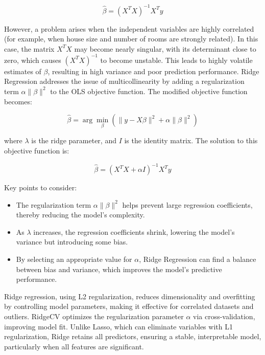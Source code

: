 \documentclass[12pt]{article}  %
\begin{document}
\begin{equation}
    \hat{\beta} = (X^T X)^{-1} X^T y \tag{2}
\end{equation}


However, a problem arises when the independent variables are highly correlated (for example, when house size and number of rooms are strongly related). In this case, the matrix \( X^T X \) may become nearly singular, with its determinant close to zero, which causes \( (X^T X)^{-1} \) to become unstable. This leads to highly volatile estimates of \( \beta \), resulting in high variance and poor prediction performance.
Ridge Regression addresses the issue of multicollinearity by adding a regularization term \( \alpha \| \beta \|^2 \) to the OLS objective function. The modified objective function becomes:

\begin{equation}
    \hat{\beta} = \arg \min_{\beta} \left( \| y - X \beta \|^2 + \alpha \| \beta \|^2 \right) \tag{3}
\end{equation}



where \( \lambda \) is the ridge parameter, and \( I \) is the identity matrix. The solution to this objective function is:

\begin{equation}
    \hat{\beta} = (X^T X + \alpha I)^{-1} X^T y \tag{4}
\end{equation}


Key points to consider:

\begin{itemize}
    \item The regularization term \( \alpha \| \beta \|^2 \) helps prevent large regression coefficients, thereby reducing the model's complexity.
    \item As \( \lambda \) increases, the regression coefficients shrink, lowering the model's variance but introducing some bias.
    \item By selecting an appropriate value for \( \alpha \), Ridge Regression can find a balance between bias and variance, which improves the model's predictive performance.
\end{itemize}

Ridge regression, using L2 regularization, reduces dimensionality and overfitting by controlling model parameters, making it effective for correlated datasets and outliers. RidgeCV optimizes the regularization parameter \( \alpha \) via cross-validation, improving model fit. Unlike Lasso, which can eliminate variables with L1 regularization, Ridge retains all predictors, ensuring a stable, interpretable model, particularly when all features are significant.
\end{document}
